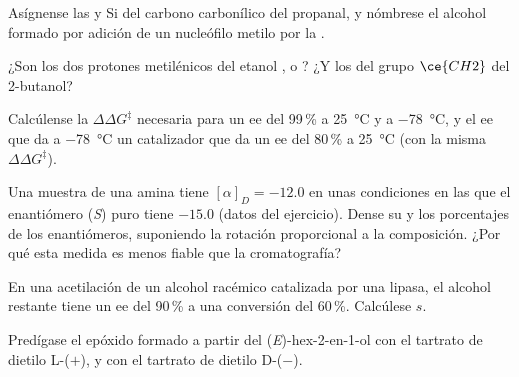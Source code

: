 \begin{exercise}[$\star$]\label{exo:b3:asymmetric-synthesis:3}
Asígnense las  y Si del carbono carbonílico del propanal, y nómbrese el alcohol
formado por adición de un nucleófilo metilo por la .
\end{exercise}

\begin{exercise}[$\star$]\label{exo:b3:asymmetric-synthesis:4}
¿Son los dos protones metilénicos del etanol ,  o ?
¿Y los del grupo $\ce{CH2}$ del 2-butanol?
\end{exercise}

\begin{exercise}[$\star\star$]\label{exo:b3:asymmetric-synthesis:5}
Calcúlense la $\Delta\Delta G^\ddagger$ necesaria para un ee del 99\,\% a \qty{25}{\celsius} y a \qty{-78}{\celsius}, y el ee que da a \qty{-78}{\celsius}
un catalizador que da un ee del 80\,\% a \qty{25}{\celsius} (con la misma $\Delta\Delta G^\ddagger$).
\end{exercise}

\begin{exercise}[$\star\star$]\label{exo:b3:asymmetric-synthesis:6}
Una muestra de una amina tiene $[\alpha]_D = -12.0$ en unas condiciones en las que el enantiómero (\textit{S})
puro tiene $-15.0$ (datos del ejercicio). Dense su  y los
porcentajes de los enantiómeros, suponiendo la rotación proporcional a la composición.
¿Por qué esta medida es menos fiable que la cromatografía?
\end{exercise}

\begin{exercise}[$\star\star$]\label{exo:b3:asymmetric-synthesis:7}
En una acetilación de un alcohol racémico catalizada por una lipasa, el alcohol restante
tiene un ee del 90\,\% a una conversión del 60\,\%. Calcúlese $s$.
\end{exercise}

\begin{exercise}[$\star\star$]\label{exo:b3:asymmetric-synthesis:8}
Predígase el epóxido formado a partir del (\textit{E})-hex-2-en-1-ol con el tartrato de dietilo L-($+$), y con el
tartrato de dietilo D-($-$).
\end{exercise}


